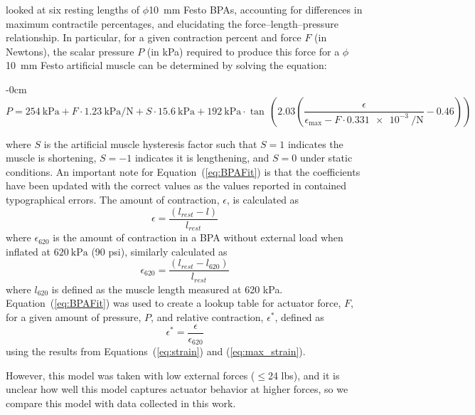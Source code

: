 \documentclass[actuators,article,accept,pdftex,moreauthors]{Definitions/mdpi}
\begin{document}
\citet{hunt_modeling_2017} looked at six resting lengths of $\phi$\qty{10}{\mm} Festo BPAs, accounting for differences in maximum contractile percentages, and elucidating the force--length--pressure relationship. In particular, for a given contraction percent and force $F$ (in Newtons), the scalar pressure $P$ (in kPa) required to produce this force for a $\phi$\qty{10}{\mm} Festo artificial muscle can be determined by solving the equation:
\begin{adjustwidth}{-\extralength}{0cm}
\begin{equation}
P = \qty{254}{\kPa} + F \cdot \qty{1.23}{\kPa\per\newton} + S \cdot \qty{15.6}{\kPa} + \qty{192}{\kPa} \cdot \tan\,\left( 2.03 \left( \frac{\epsilon}{\epsilon_{\max} - F \cdot \qty{0.331e-3}{\per\newton}} - 0.46 \right) \right)
\end{equation} \label{eq:BPAFit}
\end{adjustwidth}
where $S$ is the artificial muscle hysteresis factor such that $S=1$ indicates the muscle is shortening, $S=-1$ indicates it is lengthening, and $S=0$ under static conditions. An important note for Equation~(\ref{eq:BPAFit}) is that the coefficients have been updated with the correct values as the values reported in \cite{hunt_modeling_2017} contained typographical errors. The amount of contraction, ${\epsilon}$, is calculated as
\begin{equation}
    \epsilon = \frac{(l_{rest}-l)}{l_{rest}} \label{eq:strain}
\end{equation}
where ${\epsilon_{620}}$ is the amount of contraction in a BPA without external load when inflated at $\qty{620}{\kPa}$ (90 psi), similarly calculated as 
\begin{equation}
    \epsilon_{620} = \frac{(l_{rest}-l_{620})}{l_{rest}} \label{eq:max_strain}
\end{equation}
where $l_{620}$ is defined as the muscle length measured at 620 kPa. 
Equation~(\ref{eq:BPAFit}) was used to create a lookup table for actuator force, $F$, for a given amount of pressure, $P$, and relative contraction, $\epsilon^*$, defined as
\begin{equation}
    \epsilon^* = \frac{\epsilon}{\epsilon_{620}} \label{eq:rel_strain}
\end{equation}
using the results from Equations~(\ref{eq:strain}) and (\ref{eq:max_strain}).

However, this model was taken with low external forces ($\leq$24 lbs), and it is unclear how well this model captures actuator behavior at higher forces, so we compare this model with data collected in this work.
\end{document}
